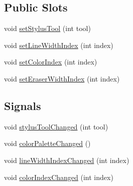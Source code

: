 \subsection*{Public Slots}
\begin{DoxyCompactItemize}
\item 
void \hyperlink{class_u_b_drawing_controller_ac5790e8e77299a58ba6f2692133b7009}{set\-Stylus\-Tool} (int tool)
\item 
void \hyperlink{class_u_b_drawing_controller_ad3264620502b9e66b043e103c39827d9}{set\-Line\-Width\-Index} (int index)
\item 
void \hyperlink{class_u_b_drawing_controller_a51849b177dc6bed87fd110056627ae94}{set\-Color\-Index} (int index)
\item 
void \hyperlink{class_u_b_drawing_controller_a1766da224301caab1dab69127e28c28c}{set\-Eraser\-Width\-Index} (int index)
\end{DoxyCompactItemize}
\subsection*{Signals}
\begin{DoxyCompactItemize}
\item 
void \hyperlink{class_u_b_drawing_controller_ae9ae9cf749d8ce65205cf8c50df67502}{stylus\-Tool\-Changed} (int tool)
\item 
void \hyperlink{class_u_b_drawing_controller_a6f11f789e8f99d826910541657502b35}{color\-Palette\-Changed} ()
\item 
void \hyperlink{class_u_b_drawing_controller_a02acf3adbfc4a9aa14da3efd01b7a530}{line\-Width\-Index\-Changed} (int index)
\item 
void \hyperlink{class_u_b_drawing_controller_a42605540fe8451289997d9b61a89e642}{color\-Index\-Changed} (int index)
\end{DoxyCompactItemize}
